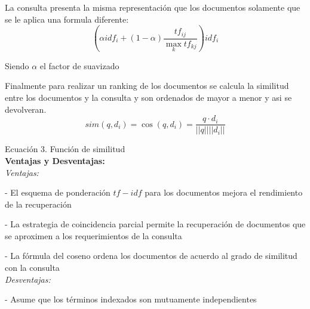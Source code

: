 \documentclass[runningheads]{llncs}
\begin{document}
La consulta presenta la misma representación que los documentos solamente que se le aplica una formula diferente:
\begin{equation}
	(\alpha idf_i + (1-\alpha)\frac{tf_{ij}}{\max_{k} tf_{kj}}) idf_i
\end{equation}

Siendo $\alpha$ el factor de suavizado

Finalmente para realizar un ranking de los documentos se calcula la similitud entre los documentos y la consulta y son ordenados de mayor a menor y asi se devolveran.
\begin{equation}
	sim(q,d_i) = \cos(q, d_i) = \frac{q \cdot d_i}{||q|| ||d_i||}
\end{equation}

Ecuación 3. Función de similitud\\

\textbf{Ventajas y Desventajas:}\\
\textit{Ventajas:} 

-	El esquema de ponderación $tf-idf$ para los documentos mejora el rendimiento de la recuperación

-	La estrategia de coincidencia parcial permite la recuperación de documentos que se aproximen a los requerimientos de la consulta

-	La fórmula del coseno ordena los documentos de acuerdo al grado de similitud con la consulta\\

\textit{Desventajas:}

-	Asume que los términos indexados son mutuamente independientes
\end{document}
